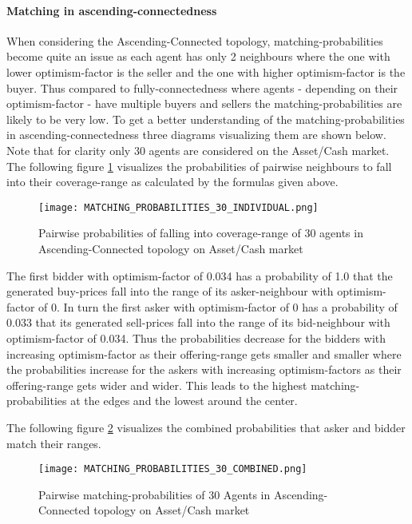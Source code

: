 \documentclass[Bachelorarbeit.tex]{subfiles}
\begin{document}
\paragraph{Matching in ascending-connectedness}
When considering the Ascending-Connected topology, matching-probabilities become quite an issue as each agent has only 2 neighbours where the one with lower optimism-factor is the seller and the one with higher optimism-factor is the buyer. Thus compared to fully-connectedness where agents - depending on their optimism-factor - have multiple buyers and sellers the matching-probabilities are likely to be very low. To get a better understanding of the matching-probabilities in ascending-connectedness three diagrams visualizing them are shown below. Note that for clarity only 30 agents are considered on the Asset/Cash market.
\medskip
The following figure \ref{fig:MATCHING_PROBABILITIES_30_INDIVIDUAL} visualizes the probabilities of pairwise neighbours to fall into their coverage-range as calculated by the formulas given above.

\begin{figure}[H]
	\centering
  \texttt{[image: MATCHING\_PROBABILITIES\_30\_INDIVIDUAL.png]}
	\caption{Pairwise probabilities of falling into coverage-range of 30 agents in Ascending-Connected topology on Asset/Cash market}
	\label{fig:MATCHING_PROBABILITIES_30_INDIVIDUAL}
\end{figure}

The first bidder with optimism-factor of 0.034 has a probability of 1.0 that the generated buy-prices fall into the range of its asker-neighbour with optimism-factor of 0. In turn the first asker with optimism-factor of 0 has a probability of 0.033 that its generated sell-prices fall into the range of its bid-neighbour with optimism-factor of 0.034. Thus the probabilities decrease for the bidders with increasing optimism-factor as their offering-range gets smaller and smaller where the probabilities increase for the askers with increasing optimism-factors as their offering-range gets wider and wider. This leads to the highest matching-probabilities at the edges and the lowest around the center.

The following figure \ref{fig:MATCHING_PROBABILITIES_30_COMBINED} visualizes the combined probabilities that asker and bidder match their ranges.

\begin{figure}[H]
	\centering
  \texttt{[image: MATCHING\_PROBABILITIES\_30\_COMBINED.png]}
	\caption{Pairwise matching-probabilities of 30 Agents in Ascending-Connected topology on Asset/Cash market}
	\label{fig:MATCHING_PROBABILITIES_30_COMBINED}
\end{figure}
\end{document}
